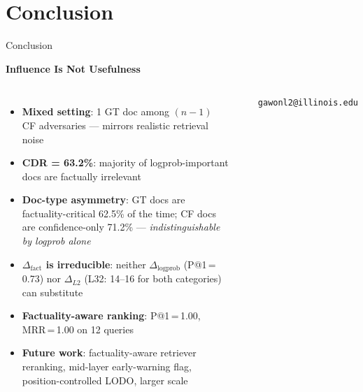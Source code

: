 \documentclass[aspectratio=169]{beamer}
\newcommand{\dlogp}{\Delta_{\mathrm{logprob}}}
\newcommand{\dfact}{\Delta_{\mathrm{fact}}}
\newcommand{\dltwo}{\Delta_{L2}}
\begin{document}
\section{Conclusion}

\begin{frame}{Conclusion}
  \begin{center}
    \LARGE\textbf{Influence Is Not Usefulness}
  \end{center}

  \vspace{0.3em}
  \begin{columns}
    \begin{itemize}\setlength{\itemsep}{0.5em}
      \item \textbf{Mixed setting}: 1 GT doc among $(n{-}1)$ CF adversaries —
            mirrors realistic retrieval noise
      \item \textbf{CDR = 63.2\%}: majority of logprob-important docs are factually irrelevant
      \item \textbf{Doc-type asymmetry}:
            GT docs are factuality-critical 62.5\% of the time;
            CF docs are confidence-only 71.2\% — \emph{indistinguishable by logprob alone}
      \item \textbf{$\dfact$ is irreducible}: neither $\dlogp$ (P@1\,=\,0.73) nor
            $\dltwo$ (L32: 14--16 for both categories) can substitute
      \item \textbf{Factuality-aware ranking}: P@1\,=\,1.00, MRR\,=\,1.00 on 12 queries
      \item \textbf{Future work}: factuality-aware retriever reranking,
            mid-layer early-warning flag, position-controlled LODO, larger scale
    \end{itemize}

    \begin{center}
    \end{center}

    \vspace{0.5em}
    \small \texttt{gawonl2@illinois.edu}
  \end{columns}
\end{frame}
\end{document}
